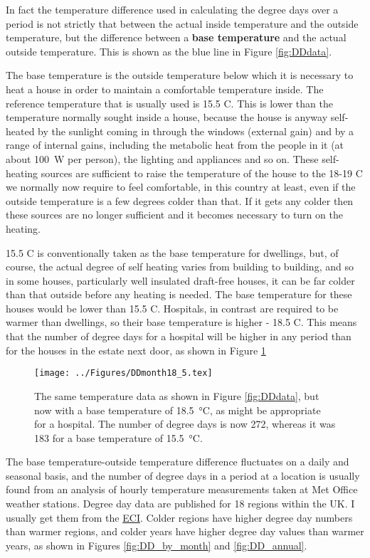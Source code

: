 \documentclass[parskip=half]{scrartcl}
\begin{document}
In fact the temperature difference used in calculating the degree days over a period is not strictly that between the actual inside temperature and the outside temperature, but the difference between a \textbf{base temperature} and the actual outside temperature. This is shown as the blue line in Figure \ref{fig:DDdata}.

The base temperature is the outside temperature below which it is necessary to heat a house in order to maintain a comfortable temperature inside. The reference temperature that is usually used is 15.5 \degree C. This is lower than the temperature normally sought inside a house, because the house is anyway self-heated by the sunlight coming in through the windows (external gain) and by a range of internal gains, including the metabolic heat from the people in it (at about \SI{100}{W} per person), the lighting and appliances and so on. These self-heating sources are sufficient to raise the temperature of the house to the 18-19 \degree C we normally now require to feel comfortable, in this country at least, even if the outside temperature is a few degrees colder than that. If it gets any colder then these sources are no longer sufficient and it becomes necessary to turn on the heating.

15.5 \degree C is conventionally taken as the base temperature for dwellings, but, of course, the actual degree of self heating varies from building to building, and so in some houses, particularly well insulated draft-free houses, it can be far colder than that outside before any heating is needed. The base temperature for these houses would be lower than 15.5 \degree C. Hospitals, in contrast are required to be warmer than dwellings, so their base temperature is higher - 18.5 \degree C. This means that the number of degree days for a hospital will be higher in any period than for the houses in the estate next door, as shown in Figure \ref{fig:high_BT}

\begin{figure}[ht]
\texttt{[image: ../Figures/DDmonth18\_5.tex]}
\caption{The same temperature data as shown in Figure \ref{fig:DDdata}, but now with a base temperature of \SI{18.5}{\celsius}, as might be appropriate for a hospital. The number of degree days is now 272, whereas it was 183 for a base temperature of \SI{15.5}{\celsius}.}
\label{fig:high_BT}
\end{figure}

The base temperature-outside temperature difference fluctuates on a daily and seasonal basis, and the number of degree days in a period at a location is usually found from an analysis of hourly temperature measurements taken at Met Office weather stations. Degree day data are published for 18 regions within the UK. I usually get them from the \href{http://www.eci.ox.ac.uk/research/energy/degreedays.php}{ECI}. Colder regions have higher degree day numbers than warmer regions, and colder years have higher degree day values than warmer years, as shown in Figures \ref{fig:DD_by_month} and \ref{fig:DD_annual}.
\end{document}
